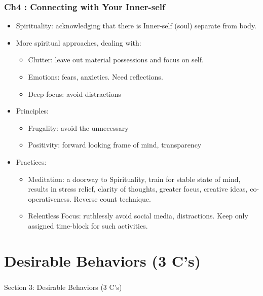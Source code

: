 \begin{frame}[fragile]\frametitle{Ch4 : Connecting with Your Inner-self }

\begin{itemize}
\item Spirituality: acknowledging that there is Inner-self (soul) separate from body.
\item More spiritual approaches, dealing with:
	\begin{itemize}
	\item Clutter: leave out material possessions and focus on self.
	\item Emotions: fears, anxieties. Need reflections.
	\item Deep focus: avoid distractions
	\end{itemize}
\item Principles:
	\begin{itemize}
	\item Frugality: avoid the unnecessary
	\item Positivity: forward looking frame of mind, transparency
	\end{itemize}
\item Practices:
	\begin{itemize}
	\item Meditation: a doorway to Spirituality, train for stable state of mind, results in stress relief, clarity of thoughts, greater focus, creative ideas, co-operativeness. Reverse count technique.
	\item Relentless Focus: ruthlessly avoid social media, distractions. Keep only assigned time-block for such activities.
	\end{itemize}	
\end{itemize}

\end{frame}

\section{Desirable Behaviors (3 C's)}

\begin{frame}[fragile]\frametitle{}
\begin{center}
{\Large Section 3: Desirable Behaviors (3 C's)}
\end{center}
\end{frame}

